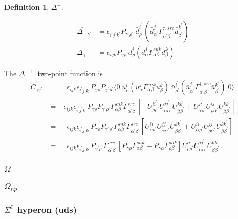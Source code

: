 \documentclass[prd,12pt,superscriptaddress,tightenlines,nofootinbib]{revtex4}
\def\a{{\alpha}}
\def\b{{\beta}}
\def\g{{\gamma}}
\def\G{{\Gamma}}
\def\ip{{i^\prime}}
\def\jp{{j^\prime}}
\def\kp{{k^\prime}}
\def\ap{{\alpha^\prime}}
\def\bp{{\beta^\prime}}
\def\gp{{\gamma^\prime}}
\def\rp{{\rho^\prime}}
\theoremstyle{plain}
\theoremstyle{definition}
\newtheorem{defn}[thm]{Definition}
\theoremstyle{remark}
\begin{document}
\begin{defn}
$\Delta^{-}$: 

\begin{align}
	\overline{\Delta^{-}}_{\gp} &= \epsilon_{\ip\jp\kp} P_{\gp\rp}\ \bar{d}^\ip_\rp (\bar{d}^{\jp}_{\ap} \G^{\dagger,src}_{\ap\bp} \bar{d}^\kp_\bp ) 
	\\
	\Delta^{-}_{\g} &= \epsilon_{ijk} P_{\g\rho}\ d^i_\rho (d^j_\a \G^{snk}_{\a\b} d^k_\b ) 
\end{align}


The $\Delta^{++}$ two-point function is
\begin{align}
C_{\g\gp} &= \phantom{-}\epsilon_{ijk} \epsilon_{\ip\jp\kp} P_{\g\rho} P_{\gp\rp} \langle 0| 
	u^i_\rho (u^j_\a \G^{snk}_{\a\b} u^k_\b ) \ \bar{u}^\ip_\rp (\bar{u}^{\jp}_{\ap} \G^{\dagger,src}_{\ap\bp} \bar{u}^\kp_\bp ) 
	|0\rangle
\nonumber\\ &=
	-\epsilon_{ijk} \epsilon_{\ip\jp\kp} P_{\g\rho} P_{\gp\rp} \G^{snk}_{\a\b} \G^{src}_{\ap\bp}
	\left[ -U^{i\ip}_{\rho\rp} U^{j\jp}_{\a\ap} U^{k\kp}_{\b\bp} 
		+ U^{j\ip}_{\a\rp} U^{i\jp}_{\rho\ap} U^{k\kp}_{\b\bp} 
	\right]
\nonumber\\ &=
	\phantom{-}\epsilon_{ijk} \epsilon_{\ip\jp\kp} P_{\g\rho} P_{\gp\rp} \G^{snk}_{\a\b} \G^{src}_{\ap\bp} 
	\left[
		U^{i\ip}_{\rho\rp} U^{j\jp}_{\a\ap} U^{k\kp}_{\b\bp} 
		+U^{i\ip}_{\a\rp} U^{j\jp}_{\rho\ap} U^{k\kp}_{\b\bp} 
	\right]
\nonumber\\ &=
	\phantom{-}\epsilon_{ijk} \epsilon_{\ip\jp\kp}  P_{\gp\rp}  \G^{src}_{\ap\bp} 
	\left[
		P_{\g\rho} \G^{snk}_{\a\b} + P_{\g\a} \G^{snk}_{\rho\b}
	\right]
	U^{i\ip}_{\rho\rp} U^{j\jp}_{\a\ap} U^{k\kp}_{\b\bp} \, .
\end{align}





\subsubsection{$\Omega$}
\subsubsection{$\Omega_{np}$}



\subsubsection{$\Sigma^0$ hyperon (uds)}



\end{defn}
\end{document}
